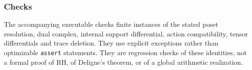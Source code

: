 \subsubsection{Checks}\label{endpoint-tau_base--checks}

The accompanying executable checks finite instances of the stated poset resolution, dual complex, internal support differential, action compatibility, tensor differentials and trace deletion. They use explicit exceptions rather than optimizable \nolinkurl{assert} statements. They are regression checks of these identities, not a formal proof of RH, of Deligne's theorem, or of a global arithmetic realization.
